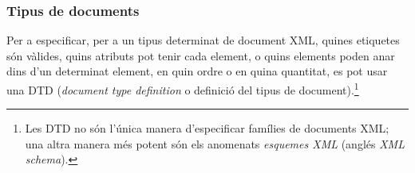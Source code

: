 \subsubsection{Tipus de documents}


Per a especificar, per a un tipus determinat de document XML, quines
etiquetes són vàlides, quins atributs pot tenir cada element, o quins
elements poden anar dins d'un determinat element, en quin ordre o en
quina quantitat, es pot usar una DTD (\emph{document type definition} o
definició del tipus de document).\footnote{Les DTD no són l'única manera d'especificar
    famílies de documents XML; una altra manera més potent són els
    anomenats \emph{esquemes XML} (anglés \emph{XML schema}).} 

